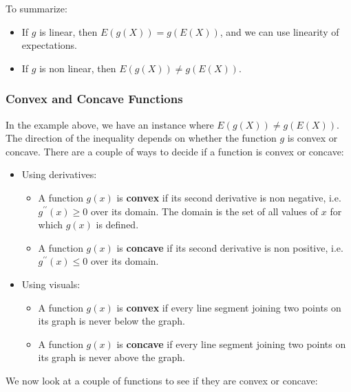 \documentclass[
]{book}
\providecommand{\tightlist}{%
  \setlength{\itemsep}{0pt}\setlength{\parskip}{0pt}}
\begin{document}
To summarize:

\begin{itemize}
\tightlist
\item
  If \(g\) is linear, then \(E(g(X)) = g(E(X))\), and we can use linearity of expectations.
\item
  If \(g\) is non linear, then \(E(g(X)) \neq g(E(X))\).
\end{itemize}

\hypertarget{convex-and-concave-functions}{%
\subsubsection{Convex and Concave Functions}\label{convex-and-concave-functions}}

In the example above, we have an instance where \(E(g(X)) \neq g(E(X))\). The direction of the inequality depends on whether the function \(g\) is convex or concave. There are a couple of ways to decide if a function is convex or concave:

\begin{itemize}
\tightlist
\item
  Using derivatives:

  \begin{itemize}
  \tightlist
  \item
    A function \(g(x)\) is \textbf{convex} if its second derivative is non negative, i.e.~\(g^{\prime \prime}(x) \geq 0\) over its domain. The domain is the set of all values of \(x\) for which \(g(x)\) is defined.
  \item
    A function \(g(x)\) is \textbf{concave} if its second derivative is non positive, i.e.~\(g^{\prime \prime}(x) \leq 0\) over its domain.
  \end{itemize}
\item
  Using visuals:

  \begin{itemize}
  \tightlist
  \item
    A function \(g(x)\) is \textbf{convex} if every line segment joining two points on its graph is never below the graph.
  \item
    A function \(g(x)\) is \textbf{concave} if every line segment joining two points on its graph is never above the graph.
  \end{itemize}
\end{itemize}

We now look at a couple of functions to see if they are convex or concave:
\end{document}

